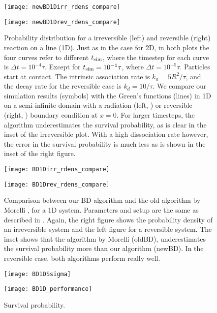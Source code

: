 \begin{figure}[hb]
\begin{minipage}[ht]{.5\linewidth}
\centering
\texttt{[image: newBD1Dirr\_rdens\_compare]}
\end{minipage}
\begin{minipage}[ht]{.5\linewidth}
\centering
\texttt{[image: newBD1Drev\_rdens\_compare]}
\end{minipage}
\caption{ Probability distribution for a irreversible (left) and reversible (right) reaction on a line (1D). Just as in the case for 2D, in both plots the four curves refer to different $t_{\rm sim}$, where the timestep for each curve is $\Delta t = 10^{-4} \tau$. Except for $t_{\rm sim}=10^{-1}\tau$, where $\Delta t=10^{-5}\tau$. Particles start at contact. The intrinsic association rate is $k_a=5 R^2/\tau$, and the decay rate for the reversible case is $k_d=10/\tau$. We compare our simulation results (symbols) with the Green's functions (lines) in 1D on a semi-infinite domain with a radiation (left, \cite{Beck1992}) or reversible (right, \cite{Agmon1984,Kim2001}) boundary condition at $x=0$. For larger timesteps, the algorithm underestimates the survival probability, as is clear in the inset of the irreversible plot. With a high dissociation rate however, the error in the survival probability is much less as is shown in the inset of the right figure.}
\end{figure}



\begin{figure}[hb]
\begin{minipage}[ht]{.5\linewidth}
\centering
\texttt{[image: BD1Dirr\_rdens\_compare]}
\end{minipage}
\begin{minipage}[ht]{.5\linewidth}
\centering
\texttt{[image: BD1Drev\_rdens\_compare]}
\end{minipage}
\caption{ Comparison between our BD algorithm and the old algorithm by Morelli \cite{Morelli2008a}, for a 1D system. Parameters and setup are the same as described in . Again, the right figure shows the probability density of an irreversible system and the left figure for a reversible system. The inset shows that the algorithm by Morelli (oldBD), underestimates the survival probability more than our algorithm (newBD). In the reversible case, both algorithms perform really well.}
\end{figure}

\begin{figure}[hb]
\begin{minipage}[ht]{.5\linewidth}
\centering
\texttt{[image: BD1DSsigma]}
\end{minipage}
\begin{minipage}[ht]{.5\linewidth}
\centering
\texttt{[image: BD1D\_performance]}
\end{minipage}
\caption{ Survival probability.}
\end{figure}